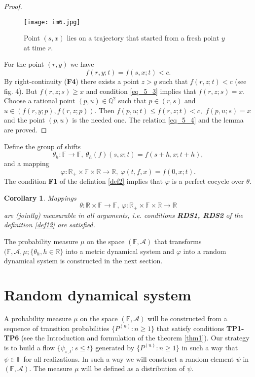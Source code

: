 \documentclass[a4paper,12pt]{article}
\newcommand{\1}{1\!\!\,{\rm I}}
\theoremstyle{plain}
\newtheorem{corollary}{Corollary}[section]
\begin{document}
\begin{proof}
	\begin{figure}[!h]
		\centering
		\caption{Point $(s,x)$ lies on a  trajectory that started from a fresh point $y$ at time $r$.}
		\texttt{[image: im6.jpg]}
	\end{figure}
	
	For the point $(r,y)$ we have
	$$
	f(r,y;t)=f(s,x;t)<c.
	$$
	By right-continuity ({\bf F4}) there exists a point $z>y$ such that $f(r,z;t)<c$ (see fig.  4). But $f(r,z;s)\geq x$ and condition \eqref{eq_5_3} implies that $f(r,z;s)=x.$ Choose a rational point $(p,u)\in \mathbb{Q}^2$ such that $p\in(r,s)$ and $u\in (f(r,y;p),f(r,z;p)).$ Then 
	$f(p,u;t)\leq f(r,z;t)<c,$ $f(p,u;s)=x$ and the point $(p,u)$ is the needed one. The relation \eqref{eq_5_4} and the lemma are proved. 
	
	
\end{proof}

Define the group of shifts 
$$
\theta_h: \mathbb{F}\to\mathbb{F}, \  \theta_h(f)(s,x;t)=f(s+h,x;t+h),
$$
and a mapping
$$
\varphi:\mathbb{R}_+\times\mathbb{F}\times\mathbb{R}\to\mathbb{R}, \  \varphi(t,f,x)=f(0,x;t).
$$
The condition {\bf F1} of the defintion \ref{def2} implies that $\varphi$ is a perfect cocycle over $\theta.$


\begin{corollary} Mappings 
	$$
	\theta:\mathbb{R}\times\mathbb{F}\to\mathbb{F}, \  \varphi:\mathbb{R}_+\times\mathbb{F}\times\mathbb{R}\to\mathbb{R}
	$$
	are (jointly) measurable in all arguments, i.e. conditions {\bf RDS1, RDS2} of the definition \ref{def12} are satisfied.
\end{corollary}
The probability measure $\mu$ on the space $(\mathbb{F},\mathcal{A})$ that transforms $(\mathbb{F},\mathcal{A},\mu;\{\theta_h,h\in\mathbb{R}\}$ into a metric dynamical system and $\varphi$ into a random dynamical system is constructed in the next section.

\section{Random dynamical system}
A probability measure $\mu$ on the space $(\mathbb{F},\mathcal{A})$ will be constructed from a sequence of transition probabilities $\{P^{(n)}:n\geq 1\}$ that satisfy conditions {\bf TP1-TP6} (see the Introduction and formulation of the theorem \ref{thm1}). Our strategy is to build a flow $\{\psi_{s,t}:s\leq t\}$ generated by $\{P^{(n)}:n\geq 1\}$ in such a way that $\psi\in \mathbb{F}$ for all realizations. In such a way we will construct a random element $\psi$ in  $(\mathbb{F},\mathcal{A}).$  The measure $\mu$ will be defined as a distribution of $\psi.$ 
\end{document}
